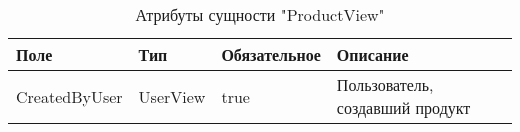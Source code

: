 \begin{xltabular}{\textwidth}{|l|l|p{1.7cm}|X|}
    \caption{Атрибуты сущности "ProductView"}\\ \hline
    Поле & Тип & Обяза\-тельное & Описание \\ \hline
    CreatedByUser & UserView & true & Пользователь, создавший продукт \\ \hline
\end{xltabular}



%

